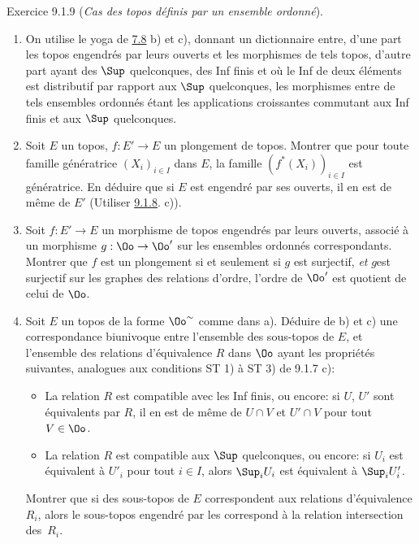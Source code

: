 \documentclass[10pt]{../fichiers-configuration-latex/smfart}
\begin{document}
\begin{enonce*}[remark]{Exercice 9.1.9}
(\emph{Cas des topos définis par un ensemble ordonné}).

\begin{enumerate}
\renewcommand{\theenumi}{\alph{enumi}}
\renewcommand{\labelenumi}{\theenumi)}
\item On utilise le yoga de \hyperref[IV.exer7.8]{7.8} b) et c), donnant un dictionnaire
entre, d'une part les topos engendrés par leurs ouverts et les
morphismes de tels topos, d'autre part  ayant
des $\Sup$ quelconques, des Inf finis et où le Inf de deux éléments %
est distributif par rapport aux $\Sup$  quelconques, les morphismes
entre de tels ensembles ordonnés étant les applications croissantes
commutant aux Inf finis et aux $\Sup$ quelconques.

\item Soit $E$ un topos, $f:E'\rightarrow E$ un plongement de
topos. Montrer que pour toute famille génératrice $(X_i)_{i\in I}$
dans $E$, la famille $(f^{\ast}(X_i))_{i \in I}$ est génératrice. En
déduire que si $E$ est engendré par ses ouverts, il en est de même
de $E'$ (Utiliser \hyperref[IV.exer9.1.8]{9.1.8}. c)).

\item Soit $f:E'\rightarrow E$ un morphisme de topos engendrés par
leurs ouverts, associé à un morphisme $g:\Oo\rightarrow \Oo'$ sur
les ensembles ordonnés correspondants. Montrer que $f$ est un
plongement si et seulement si $g$ est surjectif, \emph{et}
$g$\pageoriginale est surjectif sur les graphes des relations
d'ordre, \ie l'ordre de $\Oo'$ est quotient de celui de $\Oo$.

\item Soit $E$ un topos de la forme $\Oo^{\sim}$ comme dans
a). Déduire de b) et c) une correspondance biunivoque entre
l'ensemble des sous-topos de $E$, et l'ensemble des relations
d'équivalence $R$ dans $\Oo$ ayant les propriétés suivantes,
analogues aux conditions ST 1) à ST 3) de 9.1.7 c):
\begin{itemize}
\item[Q0 1)] La relation $R$ est compatible avec les Inf finis, ou
encore: si $U$, $U'$ sont équivalents par $R$, il en est de même de
$U\cap V$ et $U'\cap V$ pour tout $V\in \Oo$.

\item[Q0 2)] La relation $R$ est compatible aux $\Sup$ quelconques,
ou encore: si $U_i$ est équivalent à $U'_i$ pour tout $i\in I$,
alors $\Sup_i U_i$ est équivalent à $\Sup_i U'_i$.
\end{itemize}

Montrer que si des sous-topos  de $E$ correspondent aux
relations d'équivalence $R_i$, alors le sous-topos engendré par les
 correspond à la relation intersection des~$R_i$.
\end{enumerate}
\end{enonce*}
\end{document}

